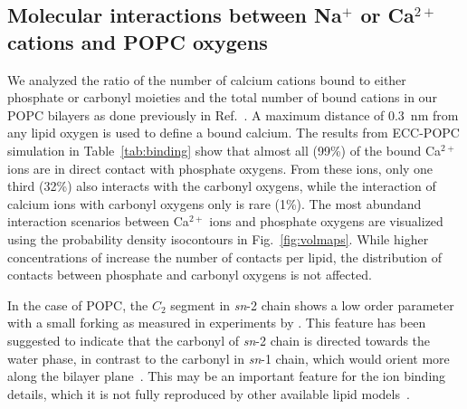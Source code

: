 \subsection{Molecular interactions between Na$^+$ or Ca$^{2+}$ cations and POPC oxygens} 
We analyzed the ratio of the number of calcium cations bound to either phosphate or carbonyl moieties and the total number of bound cations in our POPC bilayers as done previously in Ref.~\citep{javanainen17}. A maximum distance of 0.3~nm from any lipid oxygen is used to define a bound calcium. The results from ECC-POPC simulation in Table~\ref{tab:binding} show that almost all (99\%) of the bound Ca$^{2+}$ ions are in direct contact with phosphate oxygens. From these ions, only one third (32\%) also interacts with the carbonyl oxygens, while the interaction of calcium ions with carbonyl oxygens only is rare (1\%). The most abundand interaction scenarios between Ca$^{2+}$ ions and phosphate oxygens are visualized using the probability density isocontours in Fig.~\ref{fig:volmaps}. While higher concentrations of  increase the number of contacts per lipid, the distribution of contacts between phosphate and carbonyl oxygens is not affected. 
 
In the case of POPC, the $C_2$ segment in {\it sn}-2 chain shows a low order parameter with a small forking as measured in experiments by \citet{seelig75,schindler75,gawrisch92}. 
This feature has been suggested to indicate that the carbonyl
of {\it sn}-2 chain is directed towards the water phase, in contrast to the
carbonyl in {\it sn}-1 chain, which would orient more along the bilayer
plane~\cite{seelig75,schindler75,gawrisch92}. This may be an important
feature for the ion binding details, which it is not fully reproduced by other
available lipid models~\cite{ollila16}.

